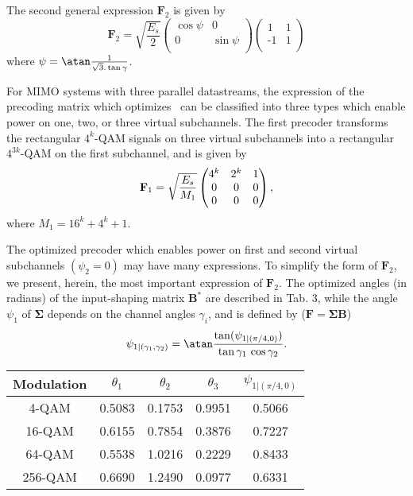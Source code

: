 The second general expression $\mathbf{F}_2$ is given by
\begin{equation}
\label{eq:ab5_F2}
\mathbf{F}_{2} = \sqrt{\frac{E_s}{2}}
		\begin{pmatrix}
			\cos\psi & 0  \\
			0 &  \sin\psi \\
		\end{pmatrix}
		\begin{pmatrix}
			1 & 1  \\
			\text{-}1 &  1 \\
		\end{pmatrix}			
\end{equation} 
where $\psi = \atan \frac{1}{\sqrt{3}. \tan\gamma}$. 

For MIMO systems with three parallel datastreams, the expression of the precoding matrix which optimizes \dmin\ can be classified into three types which enable power on one, two, or three virtual subchannels. The first precoder transforms the rectangular $4^k$-QAM signals on three virtual subchannels into a rectangular $4^{3k}$-QAM on the first subchannel, and is given by
\begin{equation}
\mathbf{F}_1 =\sqrt{E_s \over M_1}
		\begin{pmatrix}
			4^k & 2^k & 1 \\
			0 & 0 & 0 \\
			0 & 0 & 0 \\
		\end{pmatrix} ,
\end{equation}
where $M_1=16^k + 4^k + 1$.

The optimized precoder which enables power on first and second virtual subchannels $(\psi_2 = 0)$ may have many expressions. To simplify the form of $\mathbf{F}_2$, we present, herein, the most important expression of $\mathbf{F}_2$. The optimized angles (in radians) of the input-shaping matrix $\mathbf{B}^*$ are described in Tab. 3, while the angle $\psi_1$ of $\mathbf{\Sigma}$ depends on the channel angles $\gamma_i$, and is defined by ($\mathbf{F} = \mathbf{\Sigma} \mathbf{B}$) 
\begin{equation}
\psi_{1|(\gamma_1,\gamma_2)} = \atan \frac{\tan (\psi_{1|(\pi/4,0)})}{\tan\gamma_1 \, \cos\gamma_2} .
\end{equation}
\begin{center}
\begin{tabular}{c|c|c|c|c}
	\hline
	Modulation & $\theta_1$ & $\theta_2$ & $\theta_3$ & $\psi_{1|(\pi/4,0)}$ \\
	\hline
	4-QAM     & 0.5083 & 0.1753 & 0.9951 & 0.5066\\
	16-QAM   & 0.6155 & 0.7854 & 0.3876 & 0.7227\\
	64-QAM   & 0.5538 & 1.0216 & 0.2229 & 0.8433\\
	256-QAM & 0.6690 & 1.2490 & 0.0977 & 0.6331 \\
	\hline
\end{tabular}

\end{center}

